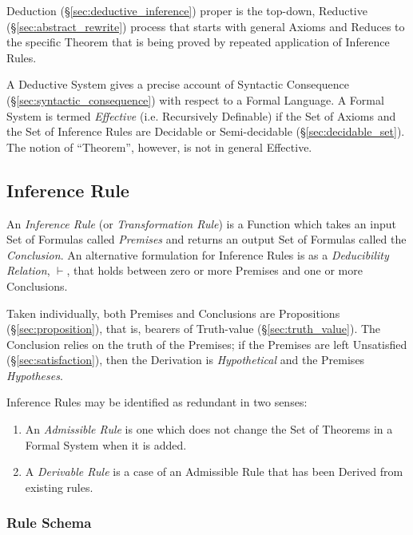 Deduction (\S\ref{sec:deductive_inference}) proper is the top-down,
Reductive (\S\ref{sec:abstract_rewrite}) process that starts with
general Axioms and Reduces to the specific Theorem that is being
proved by repeated application of Inference Rules.

A Deductive System gives a precise account of Syntactic Consequence
(\S\ref{sec:syntactic_consequence}) with respect to a Formal Language.
A Formal System is termed \emph{Effective} (i.e. Recursively
Definable) if the Set of Axioms and the Set of Inference Rules are
Decidable or Semi-decidable (\S\ref{sec:decidable_set}). The notion of
``Theorem'', however, is not in general Effective.



\subsection{Inference Rule}\label{sec:inference_rule}

An \emph{Inference Rule} (or \emph{Transformation Rule}) is a Function
which takes an input Set of Formulas called \emph{Premises} and returns an
output Set of Formulas called the \emph{Conclusion}. An alternative
formulation for Inference Rules is as a \emph{Deducibility Relation},
$\vdash$, that holds between zero or more Premises and one or more
Conclusions.

Taken individually, both Premises and Conclusions are Propositions
(\S\ref{sec:proposition}), that is, bearers of Truth-value
(\S\ref{sec:truth_value}). The Conclusion relies on the truth of the
Premises; if the Premises are left Unsatisfied
(\S\ref{sec:satisfaction}), then the Derivation is \emph{Hypothetical}
and the Premises \emph{Hypotheses}.

Inference Rules may be identified as redundant in two senses:
\begin{enumerate}
  \item An \emph{Admissible Rule} is one which does not change the Set
    of Theorems in a Formal System when it is added.
  \item A \emph{Derivable Rule} is a case of an Admissible Rule that
    has been Derived from existing rules.
\end{enumerate}



\subsubsection{Rule Schema}\label{sec:rule_schema}




